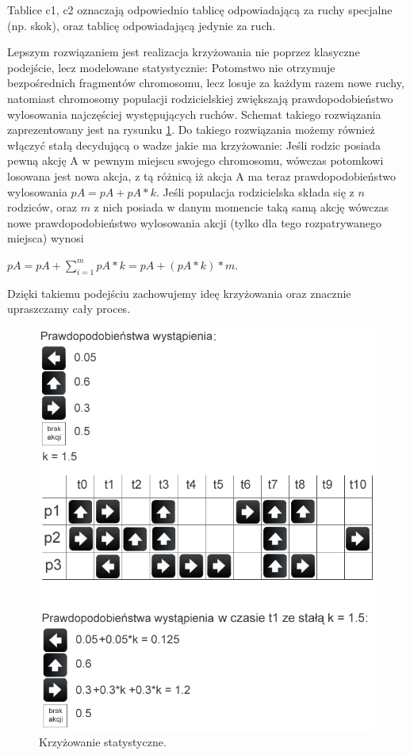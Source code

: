 \begin{par}
\begin{enumerate}
\begin{par}
		Tablice c1, c2 oznaczają odpowiednio tablicę odpowiadającą za ruchy specjalne (np. skok), oraz tablicę odpowiadającą jedynie za ruch.

		Lepszym rozwiązaniem jest realizacja krzyżowania nie poprzez klasyczne podejście, lecz modelowane statystycznie: Potomstwo nie otrzymuje bezpośrednich fragmentów chromosomu, lecz losuje za każdym razem nowe ruchy,
		natomiast chromosomy populacji rodzicielskiej zwiększają prawdopodobieństwo wylosowania najczęściej występujących ruchów.
		Schemat takiego rozwiązania zaprezentowany jest na rysunku \ref{fig:krzyżowanie}.
		Do takiego rozwiązania możemy również włączyć stałą decydującą o wadze jakie ma krzyżowanie: Jeśli rodzic posiada pewną akcję A w pewnym miejscu swojego chromosomu,
		wówczas potomkowi losowana jest nowa akcja, z tą różnicą iż akcja A ma teraz prawdopodobieństwo wylosowania $pA = pA + pA*k$. Jeśli populacja rodzicielska składa się z $n$ rodziców,
		oraz $m$ z nich posiada w danym momencie taką samą akcję wówczas nowe prawdopodobieństwo wylosowania akcji (tylko dla tego rozpatrywanego miejsca) wynosi 
		\begin{center}
		$pA =  pA + {\displaystyle\sum\limits_{i=1}^m pA*k} = pA + (pA*k)*m$.
		\end{center}
		Dzięki takiemu podejściu zachowujemy ideę krzyżowania oraz znacznie upraszczamy cały proces.
		
		\begin{figure}[!h]
		\centering
		\includegraphics[width=5in]{obrazki/stat_cross.png}
		\caption{Krzyżowanie statystyczne.}
		\label{fig:krzyżowanie}
		\end{figure}


\end{par}
\end{enumerate}
\end{par}

